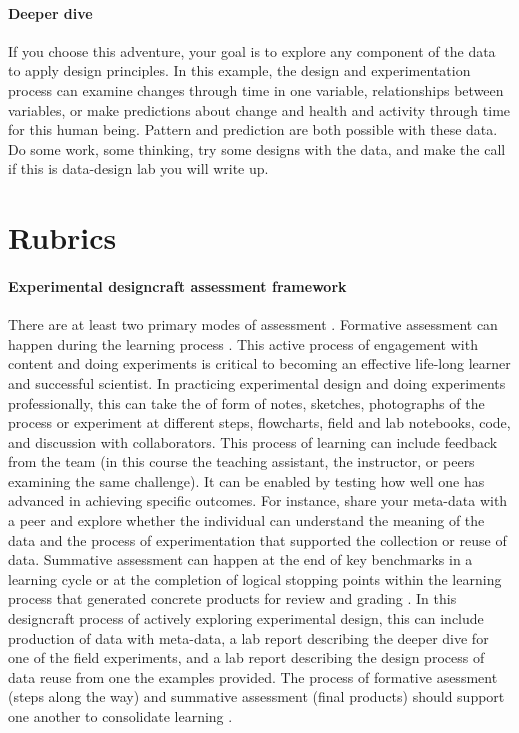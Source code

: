\documentclass[
]{book}
\begin{document}
\hypertarget{deeper-dive-5}{%
\subsubsection*{Deeper dive}\label{deeper-dive-5}}

If you choose this adventure, your goal is to explore any component of the data to apply design principles. In this example, the design and experimentation process can examine changes through time in one variable, relationships between variables, or make predictions about change and health and activity through time for this human being. Pattern and prediction are both possible with these data. Do some work, some thinking, try some designs with the data, and make the call if this is data-design lab you will write up.

\hypertarget{rubrics}{%
\chapter{Rubrics}\label{rubrics}}

\hypertarget{experimental-designcraft-assessment-framework}{%
\subsubsection*{Experimental designcraft assessment framework}\label{experimental-designcraft-assessment-framework}}

There are at least two primary modes of assessment \citep{RN6795}. Formative assessment can happen during the learning process \citep{RN6796}. This active process of engagement with content and doing experiments is critical to becoming an effective life-long learner and successful scientist. In practicing experimental design and doing experiments professionally, this can take the of form of notes, sketches, photographs of the process or experiment at different steps, flowcharts, field and lab notebooks, code, and discussion with collaborators. This process of learning can include feedback from the team (in this course the teaching assistant, the instructor, or peers examining the same challenge). It can be enabled by testing how well one has advanced in achieving specific outcomes. For instance, share your meta-data with a peer and explore whether the individual can understand the meaning of the data and the process of experimentation that supported the collection or reuse of data. Summative assessment can happen at the end of key benchmarks in a learning cycle or at the completion of logical stopping points within the learning process that generated concrete products for review and grading \citep{RN6798}. In this designcraft process of actively exploring experimental design, this can include production of data with meta-data, a lab report describing the deeper dive for one of the field experiments, and a lab report describing the design process of data reuse from one the examples provided. The process of formative asessment (steps along the way) and summative assessment (final products) should support one another to consolidate learning \citep{RN6797}.
\end{document}
